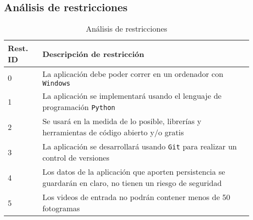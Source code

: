 \subsection{Análisis de restricciones}

\begin{table}[H]
    \begin{center}
        \begin{tabular}{p{} | p{}}
            Rest. ID & Descripción de restricción\\
            \hline
            0& La aplicación debe poder correr en un ordenador con \texttt{Windows}\\
            \hline
            1& La aplicación se implementará usando el lenguaje de programación \texttt{Python}\\
            \hline
            2& Se usará en la medida de lo posible, librerías y herramientas de código abierto y/o gratis\\
            \hline
            3& La aplicación se desarrollará usando \texttt{Git} para realizar un control de versiones\\
            \hline
            4& Los datos de la aplicación que aporten persistencia se guardarán en claro, no tienen un riesgo de seguridad\\%
            \hline
            5& Los videos de entrada no podrán contener menos de 50 fotogramas\\
            \hline
        \end{tabular} 
    \end{center}
    \caption{Análisis de restricciones}
    \label{Restricciones}
\end{table}